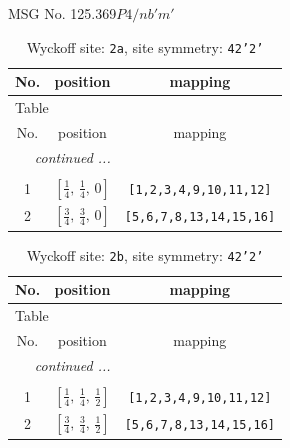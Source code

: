 \documentclass[fleqn,8pt]{jsarticle}
\begin{document}
\setcounter{MaxMatrixCols}{32}

\renewcommand{\tablename}{Table~}
\renewcommand{\figurename}{Figure~}
\begin{center}
\LARGE
MSG No. 125.369\quad$P4/nb'm'$
\end{center}
\renewcommand{\arraystretch}{1.2}
\begin{longtable}{ccc}
\caption{Wyckoff site: {\tt 2a}, site symmetry: {\tt 42'2'}}
 \\
 \hline \hline
No. & position & mapping \\ \hline \endfirsthead

\multicolumn{2}{l}{\tablename\ \thetable{}} \\
 \hline \hline
No. & position & mapping \\ \hline \endhead

 \hline \hline
\multicolumn{2}{r}{\footnotesize\it continued ...} \\ \endfoot

 \hline \hline
\multicolumn{2}{r}{} \\ \endlastfoot

1 & $\left[ \frac{1}{4},\, \frac{1}{4},\, 0 \right]$ & {\tt [1,2,3,4,9,10,11,12]} \\ \hline
2 & $\left[ \frac{3}{4},\, \frac{3}{4},\, 0 \right]$ & {\tt [5,6,7,8,13,14,15,16]} \\
\end{longtable}
\renewcommand{\arraystretch}{1.2}
\begin{longtable}{ccc}
\caption{Wyckoff site: {\tt 2b}, site symmetry: {\tt 42'2'}}
 \\
 \hline \hline
No. & position & mapping \\ \hline \endfirsthead

\multicolumn{2}{l}{\tablename\ \thetable{}} \\
 \hline \hline
No. & position & mapping \\ \hline \endhead

 \hline \hline
\multicolumn{2}{r}{\footnotesize\it continued ...} \\ \endfoot

 \hline \hline
\multicolumn{2}{r}{} \\ \endlastfoot

1 & $\left[ \frac{1}{4},\, \frac{1}{4},\, \frac{1}{2} \right]$ & {\tt [1,2,3,4,9,10,11,12]} \\ \hline
2 & $\left[ \frac{3}{4},\, \frac{3}{4},\, \frac{1}{2} \right]$ & {\tt [5,6,7,8,13,14,15,16]} \\
\end{longtable}
\end{document}
